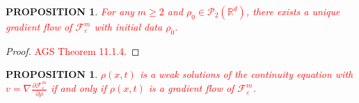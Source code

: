 \documentclass[11pt,leqno]{amsart}
\newtheorem{prop}[thm]{PROPOSITION}
\theoremstyle{definition}
\newcommand{\kcomment}[1]{{\color{Aquamarine}#1}} %
\newcommand{\Rd}{{\mathord{\mathbb R}^d}}
\newcommand{\grad}{\nabla}
\newcommand{\F}{\mathcal{F}}
\def\P{{\mathcal P}}
\def\e{\varepsilon}
\def\F{\mathcal{F}}
\begin{document}
%

\begin{prop} \label{wellposedness}
\textcolor{red}{For any $m\geq 2$ and $\rho_0 \in \P_2(\Rd)$, there exists a unique gradient flow of $\F_\e^m$ with initial data $\rho_0$.}
\end{prop}

\begin{proof}
\textcolor{red}{AGS Theorem 11.1.4.}
\end{proof}

\begin{prop} \label{characterizationGF}
\textcolor{red}{$\rho(x,t)$ is a weak solutions of the continuity equation with $v = \grad \frac{\partial \F_\e^m}{\partial \rho}$ if and only if $\rho(x,t)$ is a gradient flow of $\F_\e^m$.}
\end{prop}
\end{document}
